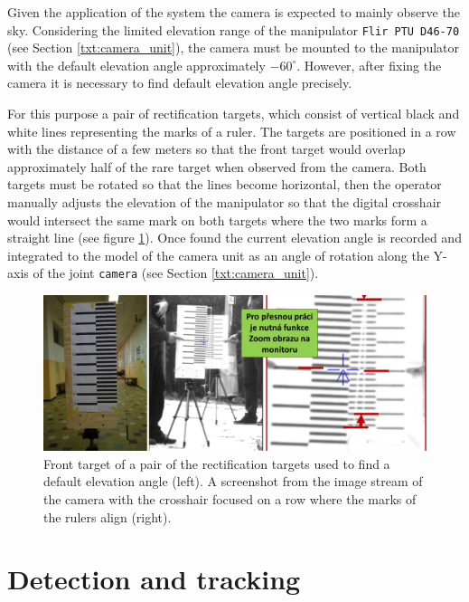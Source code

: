 Given the application of the system the camera is expected to mainly observe the sky. Considering the limited elevation range of the manipulator \texttt{Flir PTU D46-70} (see Section \ref{txt:camera_unit}), the camera must be mounted to the manipulator with the default elevation angle approximately $-60^{\circ}$. However, after fixing the camera it is necessary to find default elevation angle precisely. 

For this purpose a pair of rectification targets, which consist of vertical black and white lines representing the marks of a ruler. The targets are positioned in a row with the distance of a few meters so that the front target would overlap approximately half of the rare target when observed from the camera. Both targets must be rotated so that the lines become horizontal, then the operator manually adjusts the elevation of the manipulator so that the digital crosshair would intersect the same mark on both targets where the two marks form a straight line (see figure \ref{fig:rect_default_elevation_angle}). Once found the current elevation angle is recorded and integrated to the model of the camera unit as an angle of rotation along the Y-axis of the joint \texttt{camera} (see Section \ref{txt:camera_unit}).

\begin{figure}[htb]
	\centering
	\includegraphics[width=13cm]{fig/rect_default_elevation_angle.png}
	\caption{Front target of a pair of the rectification targets used to find a default elevation angle (left). A screenshot from the image stream of the camera with the crosshair focused on a row where the marks of the rulers align (right).}
	\label{fig:rect_default_elevation_angle}
\end{figure}


\chapter{Detection and tracking} \label{txt:detection_and_tracking}

